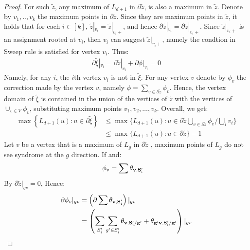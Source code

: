 \begin{proof}
  For such $\tilde{z}$, any maximum of $L_{d+1}$ in $ \partial \tilde{z} $, is also a maximum in $\tilde{z}$. Denote by $v_{1},..,v_{k}$ the maximum points in $\partial \tilde{z}$. Since they are maximum points in $\tilde{z}$, it holds that for each $i \in [k]$, $\tilde{z}|_{v_{i}} = \tilde{z}|_{v_{i}+}$, and hence $\partial \tilde{z}|_{v_{i}} = \partial \tilde{z}|_{v_{i}+}$. Since $\tilde{z}|_{v_{i}+}$ is an assignment rooted at $v_{i}$, then $v_{i}$ can suggest $\tilde{z}|_{v_{i} +}$, namely the condtion in Sweep rule is satisfied for vertex $v_{i}$. Thus:
\begin{equation*}
  \begin{split}
\partial\tilde{\xi}|_{v_{i}} =  \partial\tilde{z}|_{v_{i}} + \partial\phi|_{v_{i}} = 0
  \end{split}
\end{equation*}
Namely, for any $i$, the $i$th vertex $v_{i}$ is not in $\tilde{\xi}$. For any vertex $v$ denote by $\phi_{v}$ the correction made by the vertex $v$, namely $\phi = \sum_{v \in \partial \tilde{z}} \phi_{v}$. Hence, the vertex domain of $\tilde{\xi}$ is contained in the union of the vertices of $\tilde{z}$ with the vertices of $ \cup_{v \in V} \phi_{v} $, substituting maximum points $v_{1}, v_{2}, \ldots, v_{k}$. Overall, we get:
\begin{equation*}
  \begin{split}
    \max \left\{ L_{d+1}(u) : u \in \partial \tilde{\xi} \right\} & \le \max \big\{ L_{d+1}(u) : u \in  \partial \tilde{z} \bigcup_{v \in \partial \tilde{z} } \phi_{v} \big/ \bigcup_{i} v_{i} \big\}  \\ 
    & \le  \max \big\{ L_{d+1}(u) : u \in \partial \tilde{z} \big\} - 1
  \end{split}
\end{equation*}
Let $v$ be a vertex that is a maximum of $L_{g}$ in $\partial \tilde{z}$ , maximum points of $L_{g}$ do not see syndrome at the $g$ direction. If  and: 
\begin{equation*}
  \begin{split}
    \phi_{v} &= \sum \mathbf{\theta_{v ,S^{\prime}_{i}} } 
  \end{split}
\end{equation*}
By  $\partial \tilde{z}|_{gv} = 0 $, Hence: 
\begin{equation*}
  \begin{split}
    \partial \phi_{v}|_{gv} &= \left( \partial \sum \rotfv{v}{S^{\prime}_{i}} \right)|_{gv} \\
    &=  \left(  \sum_{S^{\prime}_{i}} \sum_{g^{\prime} \in S^{\prime}_{i} }\rotfv{v}{S^{\prime}_{i}/g^{\prime}} +\rotfv{g^{\prime}v}{S^{\prime}_{i}/g^{\prime}} \right)|_{gv} \\ 

\end{split}
\end{equation*}
\end{proof}
